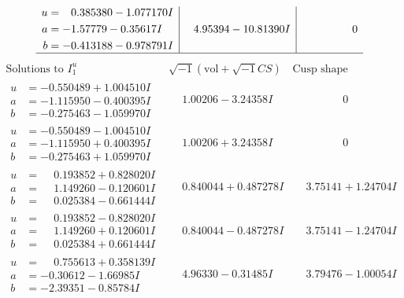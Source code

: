 \documentclass[1p]{elsarticle_modified}
\theoremstyle{definition}
\newcommand{\I}{\sqrt{-1}}
\begin{document}
$$\begin{array}{c|c|c}
\begin{aligned}
u &= \phantom{-}0.385380 - 1.077170 I \\
a &= -1.57779 - 0.35617 I \\
b &= -0.413188 - 0.978791 I\end{aligned}
 & \phantom{-}4.95394 - 10.81390 I & \phantom{-0.000000 } 0\\
 \hline 
 \end{array}$$\newpage$$\begin{array}{c|c|c}  
\text{Solutions to }I^u_{1}& \I (\text{vol} + \sqrt{-1}CS) & \text{Cusp shape}\\
 \hline 
\begin{aligned}
u &= -0.550489 + 1.004510 I \\
a &= -1.115950 - 0.400395 I \\
b &= -0.275463 - 1.059970 I\end{aligned}
 & \phantom{-}1.00206 - 3.24358 I & \phantom{-0.000000 } 0 \\ \hline\begin{aligned}
u &= -0.550489 - 1.004510 I \\
a &= -1.115950 + 0.400395 I \\
b &= -0.275463 + 1.059970 I\end{aligned}
 & \phantom{-}1.00206 + 3.24358 I & \phantom{-0.000000 } 0 \\ \hline\begin{aligned}
u &= \phantom{-}0.193852 + 0.828020 I \\
a &= \phantom{-}1.149260 - 0.120601 I \\
b &= \phantom{-}0.025384 - 0.661444 I\end{aligned}
 & \phantom{-}0.840044 + 0.487278 I & \phantom{-}3.75141 + 1.24704 I \\ \hline\begin{aligned}
u &= \phantom{-}0.193852 - 0.828020 I \\
a &= \phantom{-}1.149260 + 0.120601 I \\
b &= \phantom{-}0.025384 + 0.661444 I\end{aligned}
 & \phantom{-}0.840044 - 0.487278 I & \phantom{-}3.75141 - 1.24704 I \\ \hline\begin{aligned}
u &= \phantom{-}0.755613 + 0.358139 I \\
a &= -0.30612 - 1.66985 I \\
b &= -2.39351 - 0.85784 I\end{aligned}
 & \phantom{-}4.96330 - 0.31485 I & \phantom{-}3.79476 - 1.00054 I \\ \hline\begin{aligned}

\end{aligned}
\end{array}$$
\end{document}
